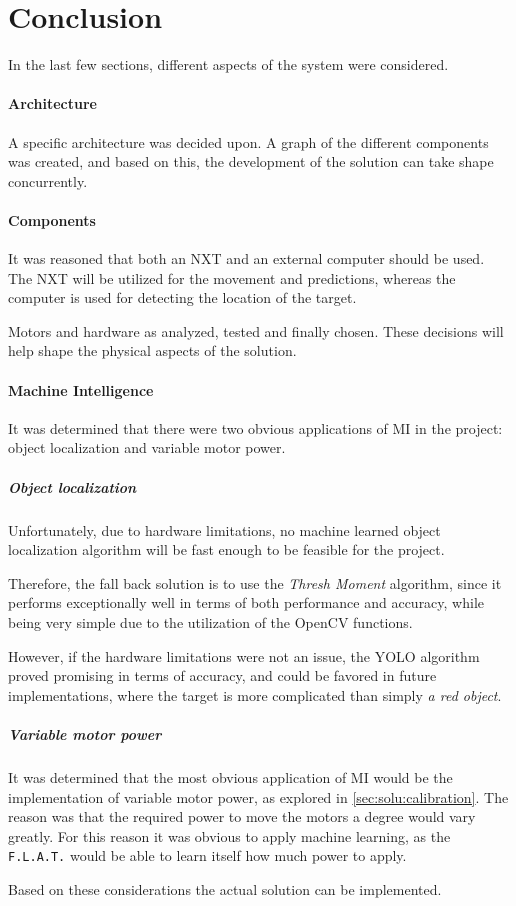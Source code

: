 \section{Conclusion}
In the last few sections, different aspects of the system were considered.

\paragraph{Architecture}
A specific architecture was decided upon.
A graph of the different components was created, and based on this, the development of the solution can take shape concurrently.


\paragraph{Components}
It was reasoned that both an NXT and an external computer should be used.
The NXT will be utilized for the movement and predictions, whereas the computer is used for detecting the location of the target.


Motors and hardware as analyzed, tested and finally chosen.
These decisions will help shape the physical aspects of the solution.


\paragraph{Machine Intelligence}
It was determined that there were two obvious applications of MI in the project: object localization and variable motor power.

\subparagraph{Object localization}
Unfortunately, due to hardware limitations, no machine learned object localization algorithm will be fast enough to be feasible for the project.

Therefore, the fall back solution is to use the \textit{Thresh Moment} algorithm, since it performs exceptionally well in terms of both performance and accuracy, while being very simple due to the utilization of the OpenCV functions.

However, if the hardware limitations were not an issue, the YOLO algorithm proved promising in terms of accuracy, and could be favored in future implementations, where the target is more complicated than simply \textit{a red object}.

\subparagraph{Variable motor power}
It was determined that the most obvious application of MI would be the implementation of variable motor power, as explored in \autoref{sec:solu:calibration}.
The reason was that the required power to move the motors a degree would vary greatly.
For this reason it was obvious to apply machine learning, as the \texttt{F.L.A.T.} would be able to learn itself how much power to apply.

Based on these considerations the actual solution can be implemented.
